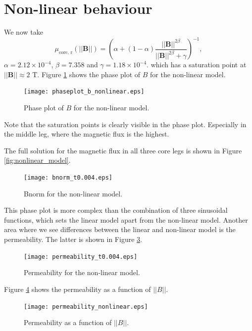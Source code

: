 \section{Non-linear behaviour}
We now take 
\begin{equation*}
\mu_{\text{core, r}}(||\textbf{B}||) = \left(\alpha + (1 - \alpha) \frac{||\textbf{B}||^{2\beta}}{||\textbf{B}||^{2\beta} + \gamma}\right)^{-1},
\end{equation*}
$\alpha = 2.12 \times 10^{-4}$, $\beta = 7.358$ and $\gamma = 1.18 \times 10^{-4}$.
which has a saturation point at $||\textbf{B}|| \approx 2$ T.
Figure \ref{fig:nonlinear_phaseplot} shows the phase plot of $B$ for the non-linear model.
\begin{figure}[t]
    \centering
    \texttt{[image: phaseplot\_b\_nonlinear.eps]}
    \caption{Phase plot of $B$ for the non-linear model.}
    \label{fig:nonlinear_phaseplot}
\end{figure}
Note that the saturation points is clearly visible in the phase plot. Especially in the middle leg, where the magnetic flux is the highest.

The full solution for the magnetic flux in all three core legs is shown in Figure \ref{fig:nonlinear_model}.
\begin{figure}[t]
    \centering
    \texttt{[image: bnorm\_t0.004.eps]}
    \caption{Bnorm for the non-linear model.}
    \label{fig:nonlinear_bnorm}
\end{figure}
This phase plot is more complex than the combination of three sinusoidal functions, which sets the linear model apart from the non-linear model.
Another area where we see differences between the linear and non-linear model is the permeability. The latter is shown in Figure \ref{fig:nonlinear_permeability}.
\begin{figure}[t]
    \centering
    \texttt{[image: permeability\_t0.004.eps]}
    \caption{Permeability for the non-linear model.}
    \label{fig:nonlinear_permeability}
\end{figure}
Figure \ref{fig:nonlinear_permeability_bnorm} shows the permeability as a function of $||B||$.
\begin{figure}[t]
    \centering
    \texttt{[image: permeability\_nonlinear.eps]}
    \caption{Permeability as a function of $||B||$.}
    \label{fig:nonlinear_permeability_bnorm}
\end{figure}





